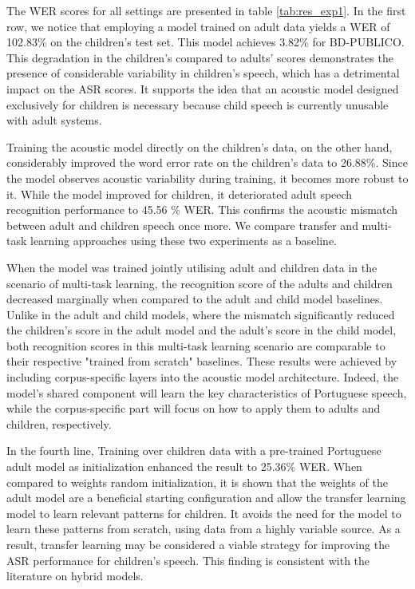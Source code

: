 The WER scores for all settings are presented in table \ref{tab:res_exp1}. In the first row, we notice that employing a model trained on adult data yields a WER of 102.83\% on the children's test set. This model achieves 3.82\% for BD-PUBLICO. This degradation in the children's compared to adults' scores demonstrates the presence of considerable variability in children's speech, which has a detrimental impact on the ASR scores. It supports the idea that an acoustic model designed exclusively for children is necessary because child speech is currently unusable with adult systems.

Training the acoustic model directly on the children's data, on the other hand, considerably improved the word error rate on the children's data to 26.88\%. Since the model observes acoustic variability during training, it becomes more robust to it. While the model improved for children, it deteriorated adult speech recognition performance to 45.56 \% WER. This confirms the acoustic mismatch between adult and children speech once more. We compare transfer and multi-task learning approaches using these two experiments as a baseline.

When the model was trained jointly utilising adult and children data in the scenario of multi-task learning, the recognition score of the adults and children decreased marginally when compared to the adult and child model baselines. Unlike in the adult and child models, where the mismatch significantly reduced the children's score in the adult model and the adult's score in the child model, both recognition scores in this multi-task learning scenario are comparable to their respective "trained from scratch" baselines. These results were achieved by including corpus-specific layers into the acoustic model architecture. 
Indeed, the model's shared component will learn the key characteristics of Portuguese speech, while the corpus-specific part will focus on how to apply them to adults and children, respectively.

In the fourth line, Training over children data with a pre-trained Portuguese adult model as initialization enhanced the result to 25.36\% WER. When compared to weights random initialization, it is shown that the weights of the adult model are a beneficial starting configuration and allow the transfer learning model to learn relevant patterns for children. It avoids the need for the model to learn these patterns from scratch, using data from a highly variable source. As a result, transfer learning may be considered a viable strategy for improving the ASR performance for children's speech. This finding is consistent with the literature on hybrid models\cite{TransferLF,TFchildren}. 

